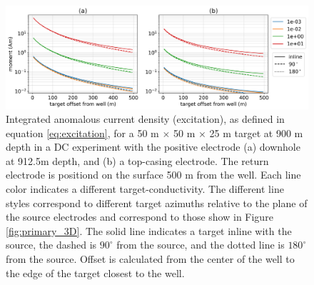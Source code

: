 \begin{figure}
    \begin{center}
    \includegraphics[width=\textwidth]{figures/excitation_3D.png}
    \end{center}
\caption{
    Integrated anomalous current density (excitation), as defined in equation \ref{eq:excitation},
    for a 50 m $\times$ 50 m $\times$ 25 m target at 900 m depth in a DC experiment with the positive electrode
    (a) downhole at 912.5m depth, and (b) a top-casing electrode. The return electrode is positiond on the
    surface 500 m from the well. Each line color indicates a different target-conductivity. The different line
    styles correspond to different target azimuths relative to the plane of the source electrodes and correspond
    to those show in Figure \ref{fig:primary_3D}. The solid line indicates a target inline with the source,
    the dashed is $90^\circ$ from the source, and the dotted line is $180^{\circ}$ from the source. Offset is
    calculated from the center of the well to the edge of the target closest to the well.
}
\label{fig:excitation_3D}
\end{figure}
